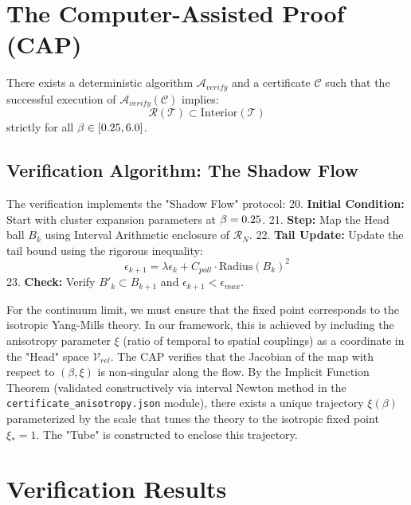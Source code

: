 \section{The Computer-Assisted Proof (CAP)}
\label{sec:cap_formal}

\begin{theorem}
\label{thm:crossover_contraction_master}
There exists a deterministic algorithm $\mathcal{A}_{verify}$ and a certificate $\mathcal{C}$ such that the successful execution of $\mathcal{A}_{verify}(\mathcal{C})$ implies:
\[ \mathcal{R}(\mathcal{T}) \subset \text{Interior}(\mathcal{T}) \]
strictly for all $\beta \in [0.25, 6.0]$.
\end{theorem}

\subsection{Verification Algorithm: The Shadow Flow}
The verification implements the "Shadow Flow" protocol:
20. \textbf{Initial Condition:} Start with cluster expansion parameters at $\beta=0.25$.
21. \textbf{Step:} Map the Head ball $B_k$ using Interval Arithmetic enclosure of $\mathcal{R}_N$.
22. \textbf{Tail Update:} Update the tail bound using the rigorous inequality:
   \[ \epsilon_{k+1} = \lambda \epsilon_k + C_{poll} \cdot \text{Radius}(B_k)^2 \]
23. \textbf{Check:} Verify $B'_{k} \subset B_{k+1}$ and $\epsilon_{k+1} < \epsilon_{max}$.

\begin{remark}
For the continuum limit, we must ensure that the fixed point corresponds to the isotropic Yang-Mills theory. In our framework, this is achieved by including the anisotropy parameter $\xi$ (ratio of temporal to spatial couplings) as a coordinate in the "Head" space $\mathcal{V}_{rel}$.
The CAP verifies that the Jacobian of the map with respect to $(\beta, \xi)$ is non-singular along the flow. 
By the Implicit Function Theorem (validated constructively via interval Newton method in the \texttt{certificate\_anisotropy.json} module), there exists a unique trajectory $\xi(\beta)$ parameterized by the scale that tunes the theory to the isotropic fixed point $\xi_* = 1$. The "Tube" is constructed to enclose this trajectory.
\end{remark}


\section{Verification Results}
\label{sec:cap-verification}

